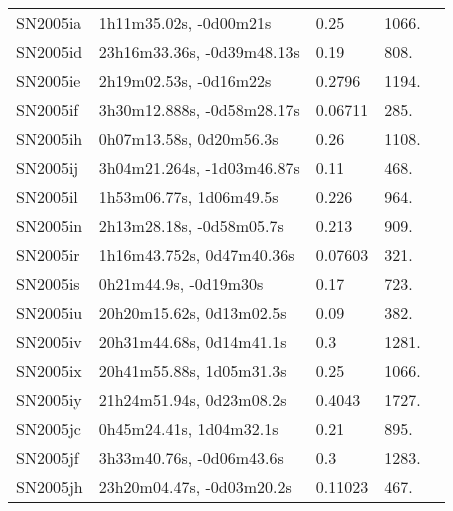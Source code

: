 \begin{longtable}{lllll}
         SN2005ia &         1h11m35.02s, -0d00m21s &     0.25 &          1066. &    \citet{2005CBET..268A...1B} \\
         SN2005id &     23h16m33.36s, -0d39m48.13s &     0.19 &           808. &    \citet{2005CBET..280A...1B} \\
         SN2005ie &         2h19m02.53s, -0d16m22s &   0.2796 &          1194. &    \citet{2011ApJ...740...92G} \\
         SN2005if &     3h30m12.888s, -0d58m28.17s &  0.06711 &           285. &    \citet{2003SDSS1.C...0000:} \\
         SN2005ih &        0h07m13.58s, 0d20m56.3s &     0.26 &          1108. &    \citet{2005CBET..268A...1B} \\
         SN2005ij &     3h04m21.264s, -1d03m46.87s &     0.11 &           468. &    \citet{2005CBET..280A...1B} \\
         SN2005il &        1h53m06.77s, 1d06m49.5s &    0.226 &           964. &    \citet{2010ApJ...713.1026D} \\
         SN2005in &       2h13m28.18s, -0d58m05.7s &    0.213 &           909. &    \citet{2010ApJ...713.1026D} \\
         SN2005ir &      1h16m43.752s, 0d47m40.36s &  0.07603 &           321. &    \citet{2016SDSSD.C...0000:} \\
         SN2005is &          0h21m44.9s, -0d19m30s &     0.17 &           723. &    \citet{2005CBET..280A...1B} \\
         SN2005iu &       20h20m15.62s, 0d13m02.5s &     0.09 &           382. &    \citet{2005CBET..280A...1B} \\
         SN2005iv &       20h31m44.68s, 0d14m41.1s &      0.3 &          1281. &    \citet{2005CBET..280A...1B} \\
         SN2005ix &       20h41m55.88s, 1d05m31.3s &     0.25 &          1066. &    \citet{2005CBET..280A...1B} \\
         SN2005iy &       21h24m51.94s, 0d23m08.2s &   0.4043 &          1727. &    \citet{2011ApJ...740...92G} \\
         SN2005jc &        0h45m24.41s, 1d04m32.1s &     0.21 &           895. &    \citet{2005CBET..280A...1B} \\
         SN2005jf &       3h33m40.76s, -0d06m43.6s &      0.3 &          1283. &    \citet{2005CBET..280A...1B} \\
         SN2005jh &      23h20m04.47s, -0d03m20.2s &  0.11023 &           467. &    \citet{2016SDSSD.C...0000:} \\

\end{longtable}

